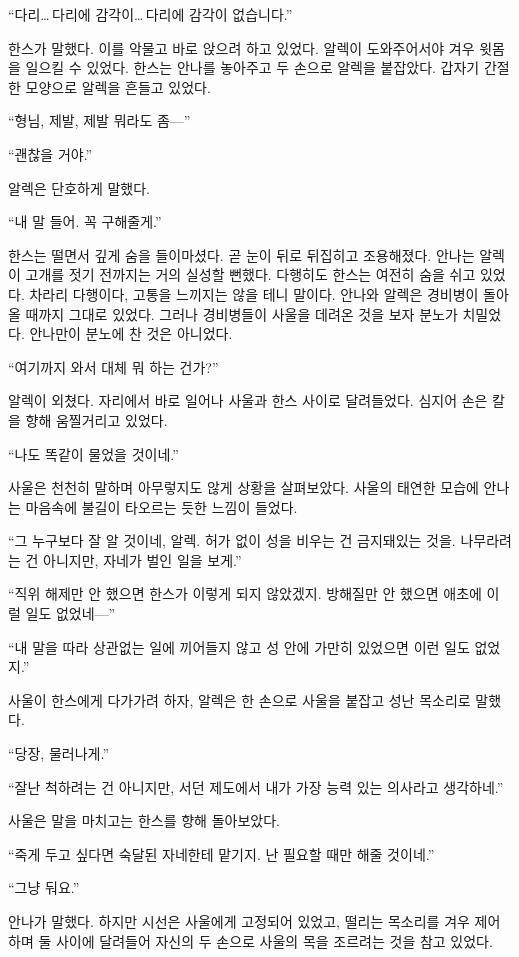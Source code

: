 ``다리\ldots\,다리에 감각이\ldots\,다리에 감각이 없습니다.''

한스가 말했다. 이를 악물고 바로 앉으려 하고 있었다. 알렉이 도와주어서야 겨우 윗몸을 일으킬 수 있었다. 한스는 안나를 놓아주고 두 손으로 알렉을 붙잡았다. 갑자기 간절한 모양으로 알렉을 흔들고 있었다.

``형님, 제발, 제발 뭐라도 좀—''

``괜찮을 거야.''

알렉은 단호하게 말했다.

``내 말 들어. 꼭 구해줄게.''

한스는 떨면서 깊게 숨을 들이마셨다. 곧 눈이 뒤로 뒤집히고 조용해졌다. 안나는 알렉이 고개를 젓기 전까지는 거의 실성할 뻔했다. 다행히도 한스는 여전히 숨을 쉬고 있었다. 차라리 다행이다, 고통을 느끼지는 않을 테니 말이다. 안나와 알렉은 경비병이 돌아올 때까지 그대로 있었다. 그러나 경비병들이 사울을 데려온 것을 보자 분노가 치밀었다. 안나만이 분노에 찬 것은 아니었다.

``여기까지 와서 대체 뭐 하는 건가?''

알렉이 외쳤다. 자리에서 바로 일어나 사울과 한스 사이로 달려들었다. 심지어 손은 칼을 향해 움찔거리고 있었다.

``나도 똑같이 물었을 것이네.''

사울은 천천히 말하며 아무렇지도 않게 상황을 살펴보았다. 사울의 태연한 모습에 안나는 마음속에 불길이 타오르는 듯한 느낌이 들었다.

``그 누구보다 잘 알 것이네, 알렉. 허가 없이 성을 비우는 건 금지돼있는 것을. 나무라려는 건 아니지만, 자네가 벌인 일을 보게.''

``직위 해제만 안 했으면 한스가 이렇게 되지 않았겠지. 방해질만 안 했으면 애초에 이럴 일도 없었네—''

``내 말을 따라 상관없는 일에 끼어들지 않고 성 안에 가만히 있었으면 이런 일도 없었지.''

사울이 한스에게 다가가려 하자, 알렉은 한 손으로 사울을 붙잡고 성난 목소리로 말했다.

``당장, 물러나게.''

``잘난 척하려는 건 아니지만, 서던 제도에서 내가 가장 능력 있는 의사라고 생각하네.''

사울은 말을 마치고는 한스를 향해 돌아보았다.

``죽게 두고 싶다면 숙달된 자네한테 맡기지. 난 필요할 때만 해줄 것이네.''

``그냥 둬요.''

안나가 말했다. 하지만 시선은 사울에게 고정되어 있었고, 떨리는 목소리를 겨우 제어하며 둘 사이에 달려들어 자신의 두 손으로 사울의 목을 조르려는 것을 참고 있었다.

